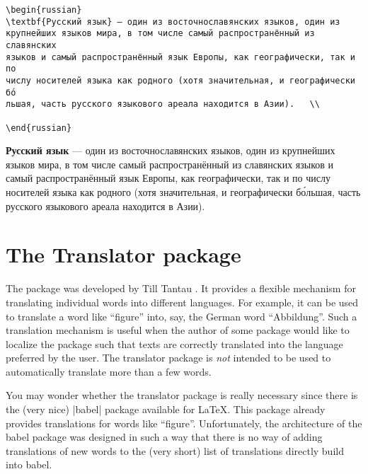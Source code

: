 \bottomline

\begin{verbatim}
\begin{russian}
\textbf{Русский язык} — один из восточнославянских языков, один из 
крупнейших языков мира, в том числе самый распространённый из славянских
языков и самый распространённый язык Европы, как географически, так и по
числу носителей языка как родного (хотя значительная, и географически бо́
льшая, часть русского языкового ареала находится в Азии).	\\

\end{russian}
\end{verbatim}



\textbf{Русский язык} — один из восточнославянских языков, один из крупнейших языков мира, в том числе самый распространённый из славянских языков и самый распространённый язык Европы, как географически, так и по числу носителей языка как родного (хотя значительная, и географически бо́льшая, часть русского языкового ареала находится в Азии).	\\





\section{The Translator package}

The  package was developed by Till Tantau \cite{translator}. It provides a flexible
mechanism for translating individual words into different languages.
For example, it can be used to translate a word like ``figure'' into,
say, the German word ``Abbildung''. Such a translation mechanism is
useful when the author of some package would like to localize the
package such that texts are correctly translated into the language
preferred by the user. The translator package is \emph{not} intended
to be used to automatically translate more than a few words. 

You may wonder whether the translator package is really necessary
since there is the (very nice) |babel| package available for
\LaTeX. This package already provides translations for words like
``figure''. Unfortunately, the architecture of the babel package was
designed in such a way that there is no way of adding translations of
new words to the (very short) list of translations directly build into
babel.

